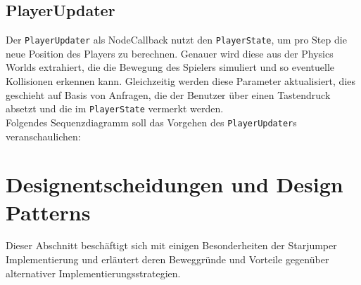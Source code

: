\documentclass{llncs}
\begin{document}
\subsection{PlayerUpdater}
Der \texttt{PlayerUpdater} als NodeCallback nutzt den \texttt{PlayerState}, um pro Step die neue Position des Players
zu berechnen. Genauer wird diese aus der Physics Worlds extrahiert, die die Bewegung des Spielers simuliert und so
eventuelle Kollisionen erkennen kann. Gleichzeitig werden diese Parameter aktualisiert, dies geschieht auf Basis von
Anfragen, die der Benutzer \"uber einen Tastendruck absetzt und die im \texttt{PlayerState} vermerkt werden.\\
Folgendes Sequenzdiagramm soll das Vorgehen des \texttt{PlayerUpdater}s veranschaulichen:

\section{Designentscheidungen und Design Patterns}
Dieser Abschnitt besch\"aftigt sich mit einigen Besonderheiten der Starjumper Implementierung und erl\"autert deren
Beweggr\"unde und Vorteile gegen\"uber alternativer Implementierungsstrategien.
\end{document}
